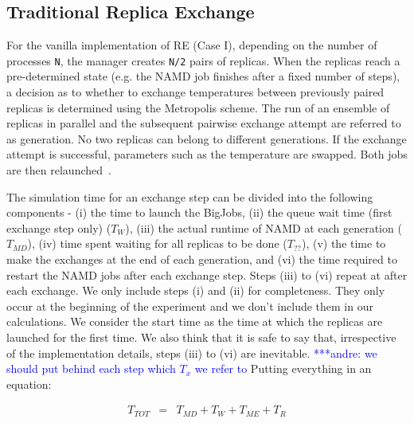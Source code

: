\documentclass[a4paper,10pt]{article}
\newcommand{\alnote}[1]{ {\textcolor{blue} { ***andre: #1 }}}
\newcommand{\alnote}[1]{}
\begin{document}


\subsection{Traditional Replica Exchange}
For the vanilla implementation of RE (Case I), depending
on the number of processes \texttt{N}, the manager creates \texttt{N/2} pairs
of replicas. When the replicas reach a
pre-determined state (e.g. the NAMD job finishes after a fixed number
of steps), a decision as to whether to exchange temperatures between
previously paired replicas is determined using the Metropolis scheme.
The run of an ensemble of replicas in parallel and the subsequent
pairwise exchange attempt are referred to as generation. No two
replicas can belong to different generations. If the exchange attempt
is successful, parameters such as the temperature are swapped. Both
jobs are then relaunched~\cite{Luckow:2008fp}.

The simulation time for an exchange step can be divided into the following components 
- (i) the time to launch the BigJobs, (ii) the queue wait time (first exchange step only) 
($T_{W}$), (iii) the actual runtime of NAMD at each generation ($T_{MD}$), (iv) time spent waiting 
for all replicas to be done ($T_{??}$), (v) the time to make the exchanges at the end of each 
generation, and (vi) the time required to restart the NAMD jobs after each exchange 
step. Steps (iii) to (vi) repeat at after each exchange. We only include steps (i) 
and (ii) for completeness. They only occur at the beginning of the experiment and 
we don't include them in our calculations. We consider the start time as the time 
at which the replicas are launched for the first time. We also think that it is 
safe to say that, irrespective of the implementation details, steps (iii) to 
(vi) are inevitable. \alnote{we should put  behind each step which $T_{x}$ we refer to} 
Putting everything in an equation:

\begin{eqnarray}
T_{TOT} &=& T_{MD} + T_{W} + T_{ME} + T_{R}
\label{eq:equation 1}
\end{eqnarray}
\end{document}
